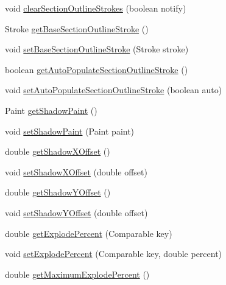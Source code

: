 \begin{DoxyCompactItemize}
\item 
void \mbox{\hyperlink{classorg_1_1jfree_1_1chart_1_1plot_1_1_pie_plot_a0ac818f27f43ff90b68c7d275d02b884}{clear\+Section\+Outline\+Strokes}} (boolean notify)
\item 
Stroke \mbox{\hyperlink{classorg_1_1jfree_1_1chart_1_1plot_1_1_pie_plot_a30e131b03d74d18e60d06e69f4219df0}{get\+Base\+Section\+Outline\+Stroke}} ()
\item 
void \mbox{\hyperlink{classorg_1_1jfree_1_1chart_1_1plot_1_1_pie_plot_a79ef0ad7ef5443afe7f8834c07f10839}{set\+Base\+Section\+Outline\+Stroke}} (Stroke stroke)
\item 
boolean \mbox{\hyperlink{classorg_1_1jfree_1_1chart_1_1plot_1_1_pie_plot_af633b0190782af18b42096b840906423}{get\+Auto\+Populate\+Section\+Outline\+Stroke}} ()
\item 
void \mbox{\hyperlink{classorg_1_1jfree_1_1chart_1_1plot_1_1_pie_plot_a3ae6a4fe194017fea49136cc08bbad19}{set\+Auto\+Populate\+Section\+Outline\+Stroke}} (boolean auto)
\item 
Paint \mbox{\hyperlink{classorg_1_1jfree_1_1chart_1_1plot_1_1_pie_plot_a0f084cdc0a89fbfaf5a2fa840c4bac03}{get\+Shadow\+Paint}} ()
\item 
void \mbox{\hyperlink{classorg_1_1jfree_1_1chart_1_1plot_1_1_pie_plot_a2a77730b54c9d7f6a3395dab0eeadcb9}{set\+Shadow\+Paint}} (Paint paint)
\item 
double \mbox{\hyperlink{classorg_1_1jfree_1_1chart_1_1plot_1_1_pie_plot_a1c2adbcc6f258fa7ff132d8dfe82216c}{get\+Shadow\+X\+Offset}} ()
\item 
void \mbox{\hyperlink{classorg_1_1jfree_1_1chart_1_1plot_1_1_pie_plot_a98d8b7faad998b6a5cbc262e4fcb9427}{set\+Shadow\+X\+Offset}} (double offset)
\item 
double \mbox{\hyperlink{classorg_1_1jfree_1_1chart_1_1plot_1_1_pie_plot_aa8ce8f748fd74382996feb0b02fa7bce}{get\+Shadow\+Y\+Offset}} ()
\item 
void \mbox{\hyperlink{classorg_1_1jfree_1_1chart_1_1plot_1_1_pie_plot_a9822ca063910bf91ac9f7c73e70428ee}{set\+Shadow\+Y\+Offset}} (double offset)
\item 
double \mbox{\hyperlink{classorg_1_1jfree_1_1chart_1_1plot_1_1_pie_plot_ab824066f262be4fe291d104aec9be9e7}{get\+Explode\+Percent}} (Comparable key)
\item 
void \mbox{\hyperlink{classorg_1_1jfree_1_1chart_1_1plot_1_1_pie_plot_a1532467123505f9c3fee0171804871fa}{set\+Explode\+Percent}} (Comparable key, double percent)
\item 
double \mbox{\hyperlink{classorg_1_1jfree_1_1chart_1_1plot_1_1_pie_plot_a588ac46cc9ea255020fb6e8f3c92e6ba}{get\+Maximum\+Explode\+Percent}} ()

\end{DoxyCompactItemize}
